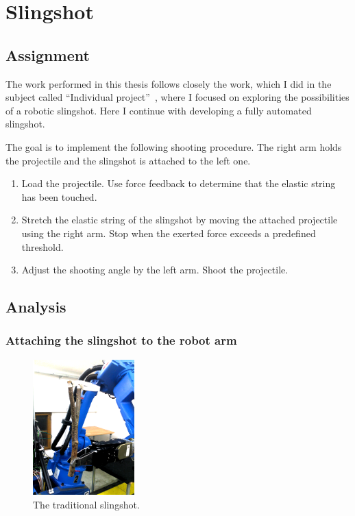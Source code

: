 \graphicspath{{Img/slingshot/}}

\section{Slingshot}

\subsection{Assignment}
The work performed in this thesis follows closely the work, which I did in the subject called ``Individual project''~\cite{PreDiplomaLejsekHlavac}, where I focused on exploring the possibilities of a robotic slingshot. Here I continue with developing a fully automated slingshot.
	
The goal is to implement the following shooting procedure. The right arm holds the projectile and the slingshot is attached to the left one.
%
		\begin{enumerate}\itemsep0pt
		    \item Load the projectile. Use force feedback to determine that the elastic string has been touched.
		    \item Stretch the elastic string of the slingshot by moving the attached projectile using the right arm. Stop when the exerted force exceeds a predefined threshold.
		    \item Adjust the shooting angle by the left arm. Shoot the projectile.
		\end{enumerate}	


\subsection{Analysis}

\subsubsection{Attaching the slingshot to the robot arm}		

\begin{figure}[h]
\includegraphics[width=0.35\textwidth]{slingshot_traditionalAdj.png}
\centering
\caption{The traditional slingshot.}
\label{fig:traditional slingshot}
\end{figure}	

